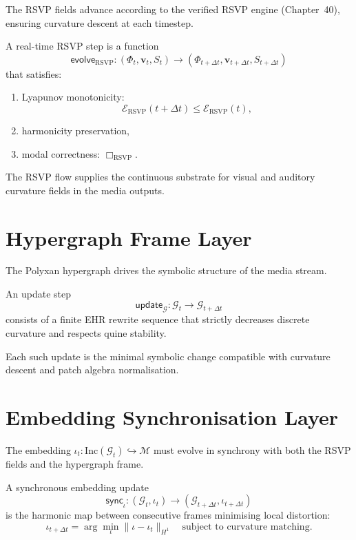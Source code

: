 The RSVP fields advance according to the verified RSVP engine (Chapter~40),
ensuring curvature descent at each timestep.

\begin{definition}
A real-time RSVP step is a function
\[
\mathsf{evolve}_{\mathrm{RSVP}} :
(\Phi_t,\mathbf{v}_t,S_t) \longrightarrow (\Phi_{t+\Delta t},
\mathbf{v}_{t+\Delta t},S_{t+\Delta t})
\]
that satisfies:
\begin{enumerate}
  \item Lyapunov monotonicity:
  \[
  \mathcal{E}_{\mathrm{RSVP}}(t+\Delta t) \le
  \mathcal{E}_{\mathrm{RSVP}}(t),
  \]
  \item harmonicity preservation,
  \item modal correctness: $\Box_{\mathrm{RSVP}}$.
\end{enumerate}
\end{definition}

The RSVP flow supplies the continuous substrate for visual and auditory
curvature fields in the media outputs.


\section{Hypergraph Frame Layer}
\label{sec:53:hypergraph}

The Polyxan hypergraph drives the symbolic structure of the media stream.

\begin{definition}
An update step
\[
\mathsf{update}_{\mathcal{G}} :
\mathcal{G}_t \longrightarrow \mathcal{G}_{t+\Delta t}
\]
consists of a finite EHR rewrite sequence that strictly decreases discrete
curvature and respects quine stability.
\end{definition}

Each such update is the minimal symbolic change compatible with
curvature descent and patch algebra normalisation.


\section{Embedding Synchronisation Layer}
\label{sec:53:embedding}

The embedding $\iota_t : \mathrm{Inc}(\mathcal{G}_t) \hookrightarrow \mathcal{M}$
must evolve in synchrony with both the RSVP fields and the hypergraph frame.

\begin{definition}
A synchronous embedding update
\[
\mathsf{sync}_{\iota} :
(\mathcal{G}_t,\iota_t) \longrightarrow (\mathcal{G}_{t+\Delta t},\iota_{t+\Delta t})
\]
is the harmonic map between consecutive frames minimising local distortion:
\[
\iota_{t+\Delta t} = \arg\min_{\iota}
\|\iota - \iota_t\|_{H^1}
\quad
\text{subject to curvature matching.}
\]
\end{definition}


